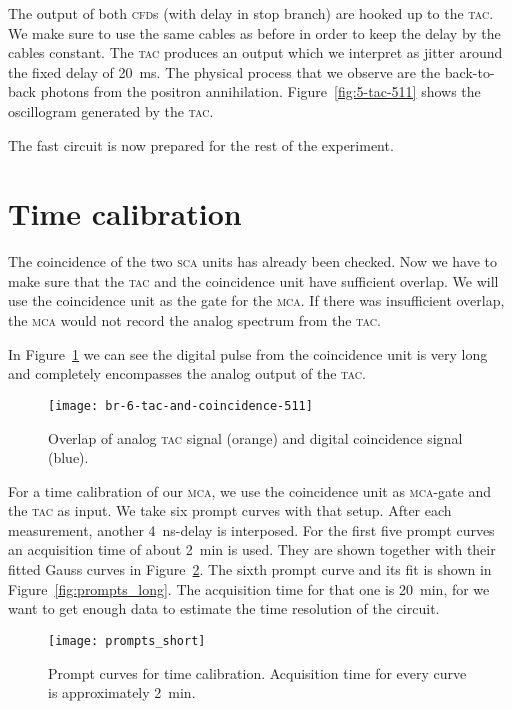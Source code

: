 \documentclass[11pt, english, fleqn, DIV=15, headinclude, BCOR=2cm]{scrreprt}
\begin{document}
The output of both \textsc{cfd}s (with delay in stop branch) are hooked up to
the \textsc{tac}. We make sure to use the same cables as before in order to
keep the delay by the cables constant. The \textsc{tac} produces an output
which we interpret as jitter around the fixed delay of \SI{20}{\milli\second}.
The physical process that we observe are the back-to-back photons from the
positron annihilation. Figure~\ref{fig:5-tac-511} shows the oscillogram
generated by the \textsc{tac}.

The fast circuit is now prepared for the rest of the experiment.

\section{Time calibration}

The coincidence of the two \textsc{sca} units has already been checked. Now we
have to make sure that the \textsc{tac} and the coincidence unit have
sufficient overlap. We will use the coincidence unit as the gate for the
\textsc{mca}. If there was insufficient overlap, the \textsc{mca} would not
record the analog spectrum from the \textsc{tac}.

In Figure~\ref{fig:6-tac-and-coincidence-511} we can see the digital pulse from
the coincidence unit is very long and completely encompasses the analog output
of the \textsc{tac}.

\begin{figure}
    \centering
    \texttt{[image: br-6-tac-and-coincidence-511]}
    \caption{%
        Overlap of analog \textsc{tac} signal (orange) and digital coincidence
        signal (blue).
    }
    \label{fig:6-tac-and-coincidence-511}
\end{figure}

For a time calibration of our \textsc{mca}, we use the coincidence unit as
\textsc{mca}-gate and the \textsc{tac} as input. We take six prompt curves with
that setup. After each measurement, another \SI{4}{\nano\second}-delay is
interposed. For the first five prompt curves an acquisition time of about
\SI{2}{\minute} is used. They are shown together with their fitted Gauss curves
in Figure~\ref{fig:prompts_short}. The sixth prompt curve and its fit is shown
in Figure~\ref{fig:prompts_long}. The acquisition time for that one is
\SI{20}{\minute}, for we want to get enough data to estimate the time resolution of
the circuit.

\begin{figure}
    \centering
    \texttt{[image: prompts\_short]}
    \caption{%
        Prompt curves for time calibration. Acquisition time for every
        curve is approximately \SI{2}{\minute}.
    }
    \label{fig:prompts_short}
\end{figure}
\end{document}
